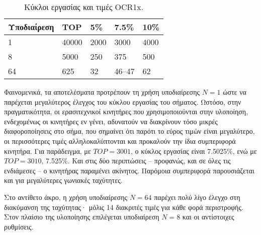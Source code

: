 \begin{table}
    \caption{Κύκλοι εργασίας και τιμές OCR1x. \label{tab:motor:prescaler}}
\begin{center}
\begin{tabu} spread 0pt {*5{X[-1r]}}

    \rowfont\bfseries
    Υποδιαίρεση &   TOP &      5\% &   7.5\% &   10\%                         \\
     & 40000 &     2000 &    3000 &   4000                         \\
              8 &  5000 &      250 &     375 &    500                         \\
             64 &   625 &       32 &  46--47 &     62                         \\
\end{tabu}
\end{center}\end{table}

Φαινομενικά, τα αποτελέσματα προτρέπουν τη χρήση υποδιαίρεσης $N = 1$ ώστε να
παρέχεται μεγαλύτερος έλεγχος του κύκλου εργασίας του σήματος. Ωστόσο, στην
πραγματικότητα, οι ερασιτεχνικοί κινητήρες που χρησιμοποιούνται στην υλοποίηση,
ενδεχομένως οι κινητήρες εν γένει, αδυνατούν να διακρίνουν τόσο μικρές
διαφοροποίησεις στο σήμα, που σημαίνει ότι παρότι το εύρος τιμών είναι
μεγαλύτερο, οι περισσότερες τιμές αλληλοκαλύπτονται και προκαλούν την ίδια
συμπεριφορά κινητήρα. Για παράδειγμα, με $TOP = 3001$, ο κύκλος εργασίας είναι
7.5025\%, ενώ με $TOP = 3010$, 7.525\%. Και στις δύο περιπτώσεις -- προφανώς,
και σε όλες τις ενδιάμεσες -- ο κινητήρας παραμένει ακίνητος. Παρόμοια
συμπεριφορά παρουσιάζεται και για μεγαλύτερες γωνιακές ταχύτητες.

Στο αντίθετο άκρο, η χρήση υποδιαίρεσης $N = 64$ παρέχει πολύ λίγο έλεγχο στη
διακύμανση της ταχύτητας· μόλις 14 διακριτές τιμές για κάθε φορά περιστροφής.
Στον πλαίσιο της υλοποίησης επιλέγεται υποδιαίρεση $N = 8$ και οι αντίστοιχες
ρυθμίσεις.

